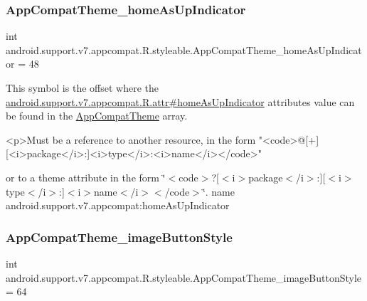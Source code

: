 \subsubsection{\texorpdfstring{App\+Compat\+Theme\+\_\+home\+As\+Up\+Indicator}{AppCompatTheme\_homeAsUpIndicator}}
{\footnotesize\ttfamily int android.\+support.\+v7.\+appcompat.\+R.\+styleable.\+App\+Compat\+Theme\+\_\+home\+As\+Up\+Indicator = 48\hspace{0.3cm}{\ttfamily [static]}}

This symbol is the offset where the \hyperlink{classandroid_1_1support_1_1v7_1_1appcompat_1_1R_1_1attr_a2d0278177bbbefbfdf59fa9761e5b439}{android.\+support.\+v7.\+appcompat.\+R.\+attr\#home\+As\+Up\+Indicator} attribute\textquotesingle{}s value can be found in the \hyperlink{classandroid_1_1support_1_1v7_1_1appcompat_1_1R_1_1styleable_a5c42f89e8a410c323be34208d75c430b}{App\+Compat\+Theme} array.

\begin{DoxyVerb}      <p>Must be a reference to another resource, in the form "<code>@[+][<i>package</i>:]<i>type</i>:<i>name</i></code>"
\end{DoxyVerb}
 or to a theme attribute in the form \char`\"{}$<$code$>$?\mbox{[}$<$i$>$package$<$/i$>$\+:\mbox{]}\mbox{[}$<$i$>$type$<$/i$>$\+:\mbox{]}$<$i$>$name$<$/i$>$$<$/code$>$\char`\"{}.  name android.\+support.\+v7.\+appcompat\+:home\+As\+Up\+Indicator \mbox{\label{classandroid_1_1support_1_1v7_1_1appcompat_1_1R_1_1styleable_a0af1c0cbacd91d7d7139ddfaf38325f6}} 
\subsubsection{\texorpdfstring{App\+Compat\+Theme\+\_\+image\+Button\+Style}{AppCompatTheme\_imageButtonStyle}}
{\footnotesize\ttfamily int android.\+support.\+v7.\+appcompat.\+R.\+styleable.\+App\+Compat\+Theme\+\_\+image\+Button\+Style = 64\hspace{0.3cm}{\ttfamily [static]}}

